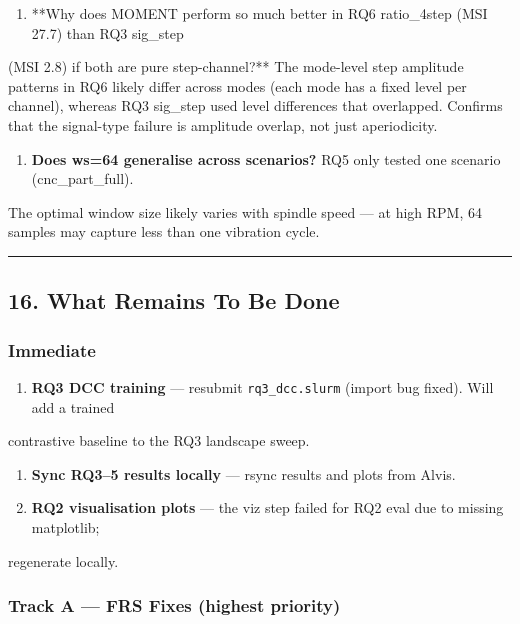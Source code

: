 \documentclass[11pt,a4paper]{article}
\begin{document}
\begin{enumerate}
  \item **Why does MOMENT perform so much better in RQ6 ratio\_4step (MSI 27.7) than RQ3 sig\_step
\end{enumerate}
   (MSI 2.8) if both are pure step-channel?** The mode-level step amplitude patterns in RQ6
   likely differ across modes (each mode has a fixed level per channel), whereas RQ3 sig\_step
   used level differences that overlapped. Confirms that the signal-type failure is amplitude
   overlap, not just aperiodicity.

\begin{enumerate}
  \item \textbf{Does ws=64 generalise across scenarios?} RQ5 only tested one scenario (cnc\_part\_full).
\end{enumerate}
   The optimal window size likely varies with spindle speed --- at high RPM, 64 samples may
   capture less than one vibration cycle.

\vspace{4pt}\hrule\vspace{4pt}

\subsection{16. What Remains To Be Done}

\subsubsection{Immediate}

\begin{enumerate}
  \item \textbf{RQ3 DCC training} --- resubmit \texttt{rq3\_dcc.slurm} (import bug fixed). Will add a trained
\end{enumerate}
   contrastive baseline to the RQ3 landscape sweep.
\begin{enumerate}
  \item \textbf{Sync RQ3--5 results locally} --- rsync results and plots from Alvis.
  \item \textbf{RQ2 visualisation plots} --- the viz step failed for RQ2 eval due to missing matplotlib;
\end{enumerate}
   regenerate locally.

\subsubsection{Track A --- FRS Fixes (highest priority)}
\end{document}

